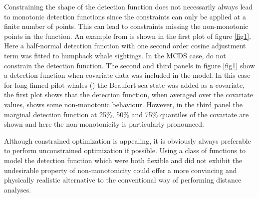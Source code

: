 Constraining the shape of the detection function does not necessarily always lead to monotonic detection functions since the constraints can only be applied at a finite number of points. This can lead to constraints missing the non-monotonic points in the function. An example from  is shown in the first plot of figure \ref{fig1}. Here a half-normal detection function with one second order cosine adjustment term was fitted to humpback whale sightings. In the MCDS case,  do not constrain the detection function. The second and third panels in figure \ref{fig1} show a detection function when covariate data was included in the model. In this case for long-finned pilot whales (\cite{pike}) the Beaufort sea state was added as a covariate, the first plot shows that the detection function, when averaged over the covariate values, shows some non-monotonic behaviour. However, in the third panel the marginal detection function at 25\%, 50\% and 75\% quantiles of the covariate are shown and here the non-monotonicity is particularly pronounced. 

Although constrained optimization is appealing, it is obviously always preferable to perform unconstrained optimization if possible. Using a class of functions to model the detection function which were both flexible and did not exhibit the undesirable property of non-monotonicity could offer a more  convincing and physically realistic alternative to the conventional way of performing distance analyses.

